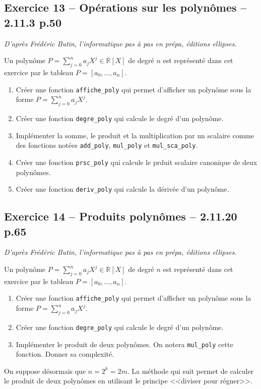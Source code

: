 \documentclass[10pt,fleqn]{article} %
\begin{document}
\begin{multicols}{2}
\subsection*{Exercice 13 -- Opérations sur les polynômes -- 2.11.3 p.50}
\begin{flushright}
\textit{D'après Frédéric Butin, l'informatique pas à pas en prépa, éditions ellipses.}
\end{flushright}
Un polynôme $P=\sum\limits_{j=0}^{n}a_j X^j \in \mathbb{R}[X]$ de degré $n$ est représenté dans cet exercice par le tableau $P=[a_0,...,a_n]$.

\begin{enumerate}
\item Créer une fonction \texttt{affiche\_poly} qui permet d'afficher un polynôme sous la forme $P=\sum\limits_{j=0}^{n}a_j X^j$.
\item Créer une fonction \texttt{degre\_poly} qui calcule le degré d'un polynôme.
\item Implémenter la somme, le produit et la multiplication par un scalaire comme des fonctions notées \texttt{add\_poly}, \texttt{mul\_poly} et \texttt{mul\_sca\_poly}.
\item Créer une fonction \texttt{prsc\_poly} qui calcule le prduit scalaire canonique de deux polynômes.
\item Créer une fonction \texttt{deriv\_poly} qui calcule la dérivée d'un polynôme.
\end{enumerate}

\subsection*{Exercice 14 -- Produits polynômes -- 2.11.20 p.65}
\begin{flushright}
\textit{D'après Frédéric Butin, l'informatique pas à pas en prépa, éditions ellipses.}
\end{flushright}
Un polynôme $P=\sum\limits_{j=0}^{n}a_j X^j \in \mathbb{R}[X]$ de degré $n$ est représenté dans cet exercice par le tableau $P=[a_0,...,a_n]$.

\begin{enumerate}
\item Créer une fonction \texttt{affiche\_poly} qui permet d'afficher un polynôme sous la forme $P=\sum\limits_{j=0}^{n}a_j X^j$.
\item Créer une fonction \texttt{degre\_poly} qui calcule le degré d'un polynôme.
\item Implémenter le produit de deux polynômes. On notera \texttt{mul\_poly} cette fonction. Donner sa complexité.
\end{enumerate}
On suppose désormais que $n=2^k=2m$. La méthode qui suit permet de calculer le produit de deux polynômes en utilisant le principe <<diviser pour régner>>. 


\end{multicols}
\end{document}

